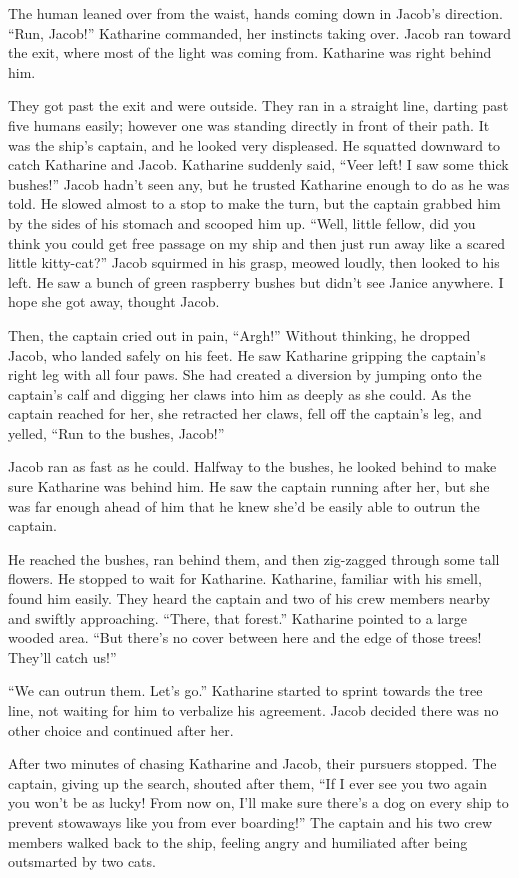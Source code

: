 The human leaned over from the waist, hands coming down in Jacob's direction. “Run, Jacob!” Katharine commanded, her instincts taking over. Jacob ran toward the exit, where most of the light was coming from. Katharine was right behind him. 

They got past the exit and were outside. They ran in a straight line, darting past five humans easily; however one was standing directly in front of their path. It was the ship's captain, and he looked very displeased. He squatted downward to catch Katharine and Jacob. Katharine suddenly said, “Veer left! I saw some thick bushes!” Jacob hadn't seen any, but he trusted Katharine enough to do as he was told. He slowed almost to a stop to make the turn, but the captain grabbed him by the sides of his stomach and scooped him up. “Well, little fellow, did you think you could get free passage on my ship and then just run away like a scared little kitty-cat?” Jacob squirmed in his grasp, meowed loudly, then looked to his left. He saw a bunch of green raspberry bushes  but didn't see Janice anywhere. I hope she got away, thought Jacob.

Then, the captain cried out in pain, “Argh!” Without thinking, he dropped Jacob, who landed safely on his feet. He saw Katharine gripping the captain's right leg with all four paws. She had created a diversion by jumping onto the captain's calf and digging her claws into him as deeply as she could. As the captain reached for her, she retracted her claws, fell off the captain's leg, and yelled, “Run to the bushes, Jacob!”

Jacob ran as fast as he could. Halfway to the bushes, he looked behind to make sure Katharine was behind him. He saw the captain running after her, but she was far enough ahead of him that he knew she'd be easily able to outrun the captain.

He reached the bushes, ran behind them, and then zig-zagged through some tall flowers. He stopped to wait for Katharine. Katharine, familiar with his smell, found him easily. They heard the captain and two of his crew members nearby and swiftly approaching. “There, that forest.” Katharine pointed to a large wooded area. “But there's no cover between here and the edge of those trees! They'll catch us!”

“We can outrun them. Let's go.” Katharine started to sprint towards the tree line, not waiting for him to verbalize his agreement. Jacob decided there was no other choice and continued after her.

After two minutes of chasing Katharine and Jacob, their pursuers stopped. The captain, giving up the search, shouted after them, “If I ever see you two again you won't be as lucky! From now on, I'll make sure there's a dog on every ship to prevent stowaways like you from ever boarding!” The captain and his two crew members walked back to the ship, feeling angry and humiliated after being outsmarted by two cats.



